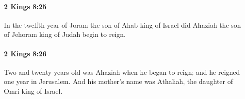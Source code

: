 		\paragraph{2 Kings 8:25} %
			\label{2KINGS-8-25}

			In the twelfth year of Joram the son of Ahab king of Israel did Ahaziah the son of Jehoram king of Judah begin to reign.


		\paragraph{2 Kings 8:26} %
			\label{2KINGS-8-26}

			Two and twenty years old was Ahaziah when he began to reign; and he reigned one year in Jerusalem. And his mother’s name was Athaliah, the daughter of Omri king of Israel.


